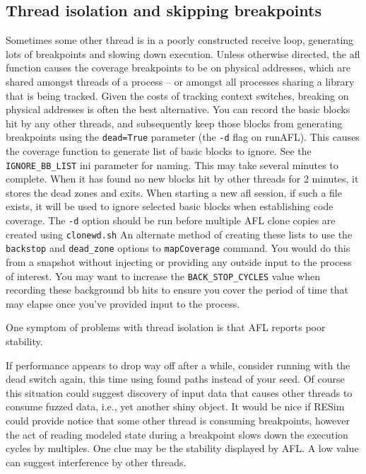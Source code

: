 \documentclass[titlepage]{article}
\begin{document}
\subsection{Thread isolation and skipping breakpoints}
Sometimes some other thread is in a poorly constructed receive loop, generating lots of breakpoints and slowing down execution.
Unless otherwise directed, the afl function causes the coverage breakpoints to be on physical addresses, which are shared amongst threads of a process -- or amongst
all processes sharing a library that is being tracked.  Given the costs
of tracking context switches, breaking on physical addresses is often the best alternative.  
You can record the basic blocks hit by any other threads, and subsequently keep those blocks from generating
breakpoints using the {\tt dead=True} parameter (the {\tt -d} flag on runAFL).  This causes the coverage function to generate list of basic blocks to ignore.
See the {\tt IGNORE\_BB\_LIST} ini parameter for naming.  This may take several minutes to complete.  When it has found no new blocks hit by other threads for 2 minutes, it stores the
dead zones and exits. When starting a new afl session, if such a file exists, it will be used to ignore selected basic blocks
when establishing code coverage.  The {\tt -d} option should be run before multiple AFL clone copies are created using {\tt clonewd.sh}
An alternate method of creating these lists to use the {\tt backstop} and {\tt dead\_zone} options to {\tt mapCoverage} command.  You would do this from a snapshot without
injecting or providing any outside input to the process of interest.  You may want to increase the {\tt BACK\_STOP\_CYCLES} value when recording these background bb hits to ensure
you cover the period of time that may elapse once you've provided input to the process.

One symptom of problems with thread isolation is that AFL reports poor stability.

If performance appears to drop way off after a while, consider running with the dead switch again, this time using found paths instead of your seed.  Of course
this situation could suggest discovery of input data that causes other threads to consume fuzzed data, i.e., yet another shiny object.
It would be nice if RESim could provide notice that some other thread is consuming breakpoints, however the act of reading modeled state during a 
breakpoint slows down the execution cycles by multiples.  One clue may be the stability displayed by AFL.  A low value can suggest interference by other threads.
\end{document}
